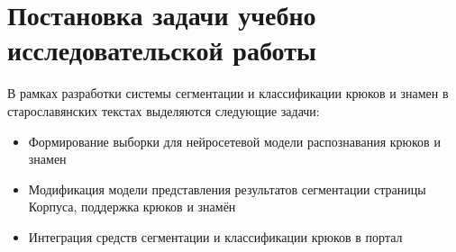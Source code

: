 \section{Постановка задачи учебно исследовательской работы}

В рамках разработки системы сегментации и классификации крюков и знамен в старославянских текстах 
выделяются следующие задачи:

\begin{itemize}
	\item Формирование выборки для нейросетевой модели распознавания крюков и знамен
	\item Модификация модели представления результатов сегментации страницы Корпуса, поддержка крюков и знамён 
	\item Интеграция средств сегментации и классификации крюков в портал
\end{itemize}


